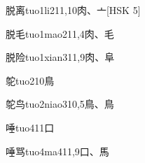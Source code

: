 \begin{EntryWithPhonetic}{脱离}{tuo1li2}{11,10}{⾁、⼇}[HSK 5]
\end{EntryWithPhonetic}

\begin{EntryWithPhonetic}{脱毛}{tuo1mao2}{11,4}{⾁、⽑}
\end{EntryWithPhonetic}

\begin{EntryWithPhonetic}{脱险}{tuo1xian3}{11,9}{⾁、⾩}
\end{EntryWithPhonetic}

\begin{EntryWithPhonetic}{鸵}{tuo2}{10}{⿃}
\end{EntryWithPhonetic}

\begin{EntryWithPhonetic}{鸵鸟}{tuo2niao3}{10,5}{⿃、⿃}
\end{EntryWithPhonetic}

\begin{EntryWithPhonetic}{唾}{tuo4}{11}{⼝}
\end{EntryWithPhonetic}

\begin{EntryWithPhonetic}{唾骂}{tuo4ma4}{11,9}{⼝、⾺}
\end{EntryWithPhonetic}


